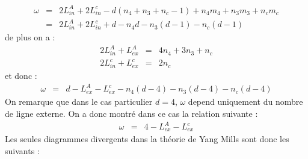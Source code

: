 \documentclass[a4paper,11pt]{article}
\theoremstyle{plain}
\theoremstyle{definition}
\theoremstyle{remark}
\numberwithin{equation}{section}
\numberwithin{equation}{subsection}
\numberwithin{figure}{section}
\begin{document}
\begin{eqnarray}
 \omega &=& 2L^{A}_{in} + 2L^{c}_{in} - d(n_{4}+n_{3}+n_{c}-1)+ n_{4}m_{4} + n_{3}m_{3} + n_{c}m_{c}\\
        &=& 2L^{A}_{in} + 2L^{c}_{in} + d - n_{4} d -n_{3} (d-1)- n_{c} (d-1)
\end{eqnarray}
de plus on a :
\begin{eqnarray}
 2L^{A}_{in} + L^{A}_{ex} &=& 4n_{4}+3n_{3}+n_{c}\\
 2L^{c}_{in} + L^{c}_{ex} &=& 2n_{c}
\end{eqnarray}
et donc :
\begin{eqnarray}
 \omega &=& d -L^{A}_{ex}-L^{c}_{ex} - n_{4} (d-4) - n_{3} (d-4) - n_{c} (d-4)
\end{eqnarray}
On remarque que dans le cas particulier $d=4$, $\omega$ depend uniquement du nombre de ligne externe. On a donc montré dans ce cas 
la relation suivante :
\begin{eqnarray}
 \omega &=& 4-L^{A}_{ex}-L^{c}_{ex}
\end{eqnarray}
Les seules diagrammes divergents dans la théorie de Yang Mills sont donc les suivants :
\end{document}
